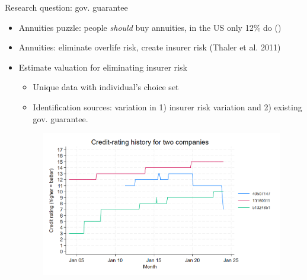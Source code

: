 \documentclass[10pt,aspectratio=169]{beamer}
\begin{document}


\begin{frame}{Research question: gov. guarantee}
\begin{itemize}
    \item Annuities puzzle: people \textit{should} buy annuities, in the US only 12\% do (\cite{modigliani_life_1986})

    \item Annuities: eliminate overlife risk, create insurer risk (Thaler et al. 2011) %

    \item Estimate valuation for eliminating insurer risk
    \begin{itemize}
        \item Unique data with individual's choice set 
        \item Identification sources: variation in 1) insurer risk variation and 2) existing gov. guarantee.  
\end{itemize}

\begin{figure}
    \centering
    \includegraphics[width=0.5\linewidth]{../figures/credit_history.png}
    \label{fig:enter-label}
\end{figure}

  \end{itemize}
 
\end{frame}
\end{document}
